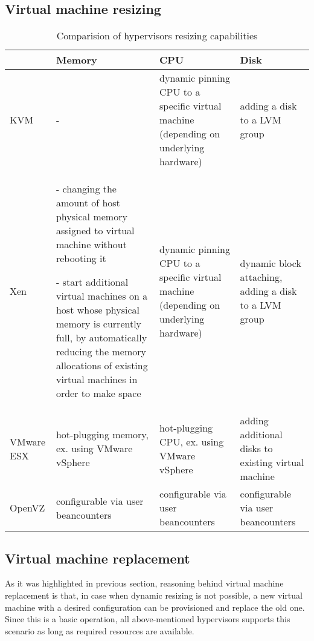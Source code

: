 \subsection*{Virtual machine resizing}


\begin{table}[!htbp]
\begin{tabularx}{\textwidth}{| l | X | X | X |}
\hline
 & \textbf{Memory} & \textbf{CPU} & \textbf{Disk} \\
\hline 
KVM &
-  & 
dynamic pinning CPU to a specific virtual machine (depending on underlying hardware)
& 
adding a disk to a LVM group

\\ \hline
Xen & 
- changing the amount of host physical memory assigned to virtual machine without rebooting it

- start additional virtual machines on a host whose physical memory is currently full, by automatically reducing the memory allocations of existing virtual machines in order to make space
&
dynamic pinning CPU to a specific virtual machine (depending on underlying hardware)
&
dynamic block attaching, adding a disk to a LVM group

\\ \hline
VMware ESX &
hot-plugging memory, ex. using VMware vSphere
&
hot-plugging CPU, ex. using VMware vSphere
&
adding additional disks to existing virtual machine

\\ \hline
OpenVZ &
configurable via user beancounters
&
configurable via user beancounters 
& 
configurable via user beancounters
\\ \hline
\end{tabularx}
\caption{Comparision of hypervisors resizing capabilities}
\label{tab:hypervisors-resizing}
\end{table}


\subsection*{Virtual machine replacement}
As it was highlighted in previous section, reasoning behind virtual machine replacement is that, in case when dynamic resizing is not possible, a new virtual machine with a desired configuration can be provisioned and replace the old one. Since this is a basic operation, all above-mentioned hypervisors supports this scenario as long as required resources are available. 
